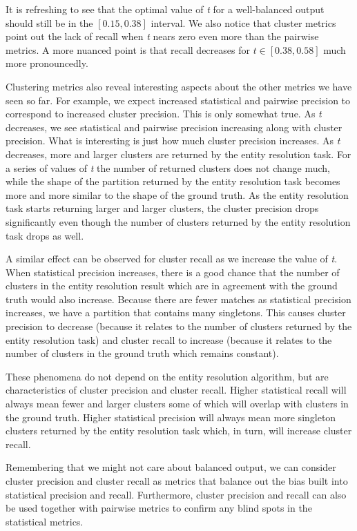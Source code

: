 It is refreshing to see that the optimal value of \textit{t} for a well-balanced
output should still be in the $\left[0.15,0.38\right]$ interval.
We also notice that cluster metrics point out the lack of recall when \textit{t}
nears zero even more than the pairwise metrics.
A more nuanced point is that recall decreases for $t \in \left[0.38,0.58\right]$
much more pronouncedly.

Clustering metrics also reveal interesting aspects about the other metrics we have
seen so far.
For example, we expect increased statistical and pairwise precision to
correspond to increased cluster precision.
This is only somewhat true.
As \textit{t} decreases, we see statistical and pairwise precision increasing
along with cluster precision.
What is interesting is just how much cluster precision increases.
As \textit{t} decreases, more and larger clusters are returned by the entity
resolution task.
For a series of values of \textit{t} the number of returned clusters does not
change much, while the shape of the partition returned by the entity resolution
task becomes more and more similar to the shape of the ground truth.
As the entity resolution task starts returning larger and larger clusters, the
cluster precision drops significantly even though the number of clusters
returned by the entity resolution task drops as well.

A similar effect can be observed for cluster recall as we increase the value of
\textit{t}.
When statistical precision increases, there is a good chance that the number of
clusters in the entity resolution result which are in agreement with the ground
truth would also increase.
Because there are fewer matches as statistical precision increases, we have a
partition that contains many singletons.
This causes cluster precision to decrease (because it relates to the number of
clusters returned by the entity resolution task) and cluster recall to increase
(because it relates to the number of clusters in the ground truth which remains
constant).

These phenomena do not depend on the entity resolution algorithm, but are
characteristics of cluster precision and cluster recall.
Higher statistical recall will always mean fewer and larger clusters some of
which will overlap with clusters in the ground truth.
Higher statistical precision will always mean more singleton clusters returned
by the entity resolution task which, in turn, will increase cluster recall.

Remembering that we might not care about balanced output, we can consider
cluster precision and cluster recall as metrics that balance out the bias built
into statistical precision and recall.
Furthermore, cluster precision and recall can also be used together with
pairwise metrics to confirm any blind spots in the statistical metrics.

